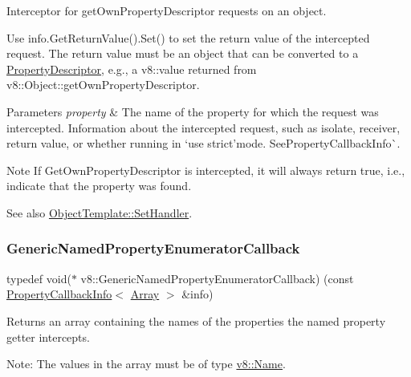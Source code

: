 Interceptor for get\+Own\+Property\+Descriptor requests on an object.

Use {\ttfamily info.\+Get\+Return\+Value().Set()} to set the return value of the intercepted request. The return value must be an object that can be converted to a \mbox{\hyperlink{classv8_1_1PropertyDescriptor}{Property\+Descriptor}}, e.\+g., a {\ttfamily v8\+::value} returned from {\ttfamily v8\+::\+Object\+::get\+Own\+Property\+Descriptor}.


\begin{DoxyParams}{Parameters}
{\em property} & The name of the property for which the request was intercepted.  Information about the intercepted request, such as isolate, receiver, return value, or whether running in `\textquotesingle{}use strict'{\ttfamily mode. See}Property\+Callback\+Info\`{}.\\
\hline
\end{DoxyParams}
\begin{DoxyNote}{Note}
If Get\+Own\+Property\+Descriptor is intercepted, it will always return true, i.\+e., indicate that the property was found.
\end{DoxyNote}
See also {\ttfamily \mbox{\hyperlink{classv8_1_1ObjectTemplate_a3d5666f1e9b0f46df6b4dbb7cfbb6114}{Object\+Template\+::\+Set\+Handler}}}. \mbox{\label{namespacev8_a20826eb7e52e84fa4f632534e8eddd04}} 
\subsubsection{\texorpdfstring{Generic\+Named\+Property\+Enumerator\+Callback}{GenericNamedPropertyEnumeratorCallback}}
{\footnotesize\ttfamily typedef void($\ast$ v8\+::\+Generic\+Named\+Property\+Enumerator\+Callback) (const \mbox{\hyperlink{classv8_1_1PropertyCallbackInfo}{Property\+Callback\+Info}}$<$ \mbox{\hyperlink{classv8_1_1Array}{Array}} $>$ \&info)}

Returns an array containing the names of the properties the named property getter intercepts.

Note\+: The values in the array must be of type \mbox{\hyperlink{classv8_1_1Name}{v8\+::\+Name}}. \mbox{\label{namespacev8_a24b1801fa53a7c5a71366d8044927563}} 
